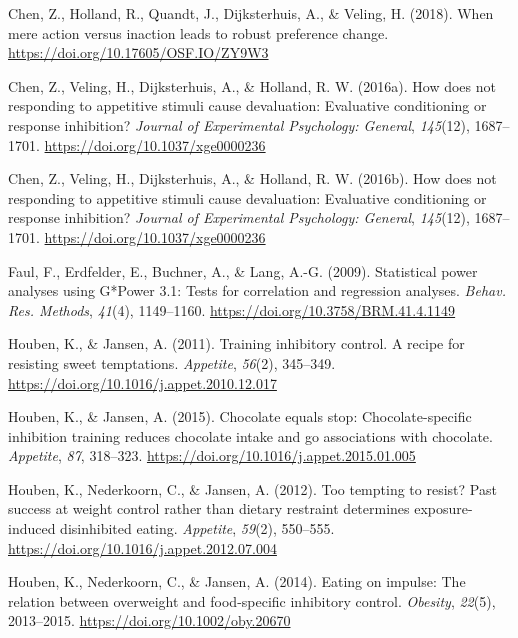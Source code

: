 \documentclass[man,floatsintext]{apa6}
\begin{document}
\hypertarget{ref-chen_when_2018}{}
Chen, Z., Holland, R., Quandt, J., Dijksterhuis, A., \& Veling, H.
(2018). When mere action versus inaction leads to robust preference
change. \url{https://doi.org/10.17605/OSF.IO/ZY9W3}

\hypertarget{ref-chen_how_2016-1}{}
Chen, Z., Veling, H., Dijksterhuis, A., \& Holland, R. W. (2016a). How
does not responding to appetitive stimuli cause devaluation: Evaluative
conditioning or response inhibition? \emph{Journal of Experimental
Psychology: General}, \emph{145}(12), 1687--1701.
\url{https://doi.org/10.1037/xge0000236}

\hypertarget{ref-chen_how_2016}{}
Chen, Z., Veling, H., Dijksterhuis, A., \& Holland, R. W. (2016b). How
does not responding to appetitive stimuli cause devaluation: Evaluative
conditioning or response inhibition? \emph{Journal of Experimental
Psychology: General}, \emph{145}(12), 1687--1701.
\url{https://doi.org/10.1037/xge0000236}

\hypertarget{ref-faul_statistical_2009}{}
Faul, F., Erdfelder, E., Buchner, A., \& Lang, A.-G. (2009). Statistical
power analyses using G*Power 3.1: Tests for correlation and regression
analyses. \emph{Behav. Res. Methods}, \emph{41}(4), 1149--1160.
\url{https://doi.org/10.3758/BRM.41.4.1149}

\hypertarget{ref-houben_training_2011}{}
Houben, K., \& Jansen, A. (2011). Training inhibitory control. A recipe
for resisting sweet temptations. \emph{Appetite}, \emph{56}(2),
345--349. \url{https://doi.org/10.1016/j.appet.2010.12.017}

\hypertarget{ref-houben_chocolate_2015}{}
Houben, K., \& Jansen, A. (2015). Chocolate equals stop:
Chocolate-specific inhibition training reduces chocolate intake and go
associations with chocolate. \emph{Appetite}, \emph{87}, 318--323.
\url{https://doi.org/10.1016/j.appet.2015.01.005}

\hypertarget{ref-houben_too_2012}{}
Houben, K., Nederkoorn, C., \& Jansen, A. (2012). Too tempting to
resist? Past success at weight control rather than dietary restraint
determines exposure-induced disinhibited eating. \emph{Appetite},
\emph{59}(2), 550--555.
\url{https://doi.org/10.1016/j.appet.2012.07.004}

\hypertarget{ref-houben_eating_2014}{}
Houben, K., Nederkoorn, C., \& Jansen, A. (2014). Eating on impulse: The
relation between overweight and food-specific inhibitory control.
\emph{Obesity}, \emph{22}(5), 2013--2015.
\url{https://doi.org/10.1002/oby.20670}
\end{document}
